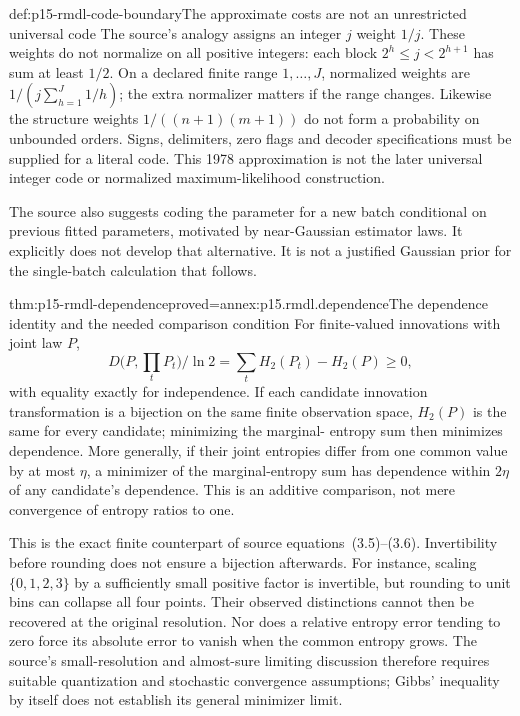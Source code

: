 \begin{hbwarning}{def:p15-rmdl-code-boundary}{The approximate costs are not an unrestricted universal code}
The source's analogy assigns an integer \(j\) weight \(1/j\).
These weights do not normalize on all positive integers: each block
\(2^h\leq j<2^{h+1}\) has sum at least \(1/2\). On a declared
finite range \(1,\ldots,J\), normalized weights are
\(1/(j\sum_{h=1}^J1/h)\); the extra normalizer matters if the range
changes. Likewise the structure weights
\(1/((n+1)(m+1))\) do not form a probability on unbounded orders.
Signs, delimiters, zero flags and decoder specifications must be supplied
for a literal code. This 1978 approximation is not the later universal
integer code or normalized maximum-likelihood construction.
\end{hbwarning}

The source also suggests coding the parameter for a new batch conditional
on previous fitted parameters, motivated by near-Gaussian estimator laws.
It explicitly does not develop that alternative. It is not a justified
Gaussian prior for the single-batch calculation that follows.

\begin{hbtheorem}{thm:p15-rmdl-dependence}{proved=annex:p15.rmdl.dependence}{The dependence identity and the needed comparison condition}
For finite-valued innovations with joint law \(P\),
\[
 D\bigl(P,\prod_tP_t\bigr)/\ln2
       =\sum_tH_2(P_t)-H_2(P)\geq0,
\]
with equality exactly for independence. If each candidate innovation
transformation is a bijection on the same finite observation space,
\(H_2(P)\) is the same for every candidate; minimizing the marginal-
entropy sum then minimizes dependence. More generally, if their joint
entropies differ from one common value by at most \(\eta\), a minimizer
of the marginal-entropy sum has dependence within \(2\eta\) of any
candidate's dependence. This is an additive comparison, not mere convergence
of entropy ratios to one.
\end{hbtheorem}

This is the exact finite counterpart of source equations~(3.5)--(3.6).
Invertibility before rounding does not ensure a bijection afterwards.
For instance, scaling \(\{0,1,2,3\}\) by a sufficiently small positive
factor is invertible, but rounding to unit bins can collapse all four
points. Their observed distinctions cannot then be recovered at the
original resolution. Nor does a relative entropy error tending to zero
force its absolute error to vanish when the common entropy grows.
The source's small-resolution and almost-sure limiting discussion therefore
requires suitable quantization and stochastic convergence assumptions;
Gibbs' inequality by itself does not establish its general minimizer limit.

